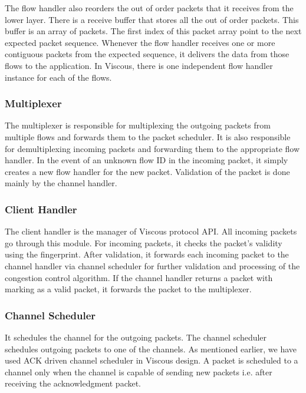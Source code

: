The flow handler also reorders the out of order packets that  it receives from the lower layer. There is a receive buffer that stores all the out of order packets. This buffer is an array of packets. The first index of this packet array point to the next expected packet sequence. Whenever the flow handler receives one or more contiguous packets from the expected sequence, it delivers the data from those flows to the application. In Viscous, there is one independent flow handler instance for each of the flows.

\subsubsection{Multiplexer}
The multiplexer is responsible for multiplexing the outgoing packets from multiple flows and forwards them to the packet scheduler. It is also responsible for demultiplexing incoming packets and forwarding them to the appropriate flow handler. In the event of an unknown flow ID in the incoming packet, it simply creates a new flow handler for the new packet. Validation of the packet is done mainly by the channel handler.

\subsubsection{Client Handler}
The client handler is the manager of Viscous protocol API. All incoming packets go through this module. For incoming packets, it checks the packet's validity using the fingerprint.  After validation, it forwards each incoming packet to the channel handler via channel scheduler for further validation and processing of the congestion control algorithm. If the channel handler returns a packet with marking as a valid packet, it forwards the packet to the multiplexer.

\subsubsection{Channel Scheduler}
It schedules the channel for the outgoing packets. The channel scheduler schedules outgoing packets to one of the channels. As mentioned earlier, we have used ACK driven channel scheduler in Viscous design. A packet is scheduled to a channel only when the channel is capable of sending new packets i.e. after receiving the acknowledgment packet. %

